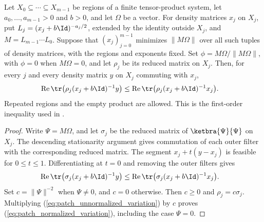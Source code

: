 \begin{theorem}
\label{thm:patch_normalized_first_variation}
\leanok
Let $X_0\subseteq\cdots\subseteq X_{m-1}$ be regions of a finite tensor-product
system, let $a_0,\dots,a_{m-1}>0$ and $b>0$, and let $\Omega$ be a vector.
For density matrices $x_j$ on $X_j$, put $L_j=(x_j+b\Id)^{-a_j/2}$,
extended by the identity outside $X_j$, and $M=L_{m-1}\cdots L_0$.
Suppose that $(x_j)_{j=0}^{m-1}$ minimizes $\lVert M\Omega\rVert$ over all
such tuples of density matrices, with the regions and exponents fixed.
Set $\phi=M\Omega/\lVert M\Omega\rVert$, with $\phi=0$ when $M\Omega=0$,
and let $\rho_j$ be its reduced matrix on $X_j$.
Then, for every $j$ and every density matrix $y$ on $X_j$ commuting with $x_j$,
\begin{align}
 \operatorname{Re}\tr\bigl(\rho_j(x_j+b\Id)^{-1}y\bigr)
 &\le \operatorname{Re}\tr\bigl(\rho_j(x_j+b\Id)^{-1}x_j\bigr).
 \label{eq:patch_normalized_variation}
\end{align}
Repeated regions and the empty product are allowed.
This is the first-order inequality used in
\cite[Section~4, first-order patch inequalities]{OpenAI2026PolynomialPEPS}.
\end{theorem}
\begin{proof}
\leanok
{}
Write $\Psi=M\Omega$, and let $\sigma_j$ be the reduced matrix of
$\ketbra{\Psi}{\Psi}$ on $X_j$. The descending stationarity argument gives
commutation of each outer filter with the corresponding reduced matrix.
The segment $x_j+t(y-x_j)$ is feasible for $0\le t\le1$.
Differentiating at $t=0$ and removing the outer filters gives
\begin{align}
 \operatorname{Re}\tr\bigl(\sigma_j(x_j+b\Id)^{-1}y\bigr)
 &\le \operatorname{Re}\tr\bigl(\sigma_j(x_j+b\Id)^{-1}x_j\bigr).
 \label{eq:patch_unnormalized_variation}
\end{align}
Set $c=\lVert\Psi\rVert^{-2}$ when $\Psi\ne0$, and $c=0$ otherwise.
Then $c\ge0$ and $\rho_j=c\sigma_j$. Multiplying
(\ref{eq:patch_unnormalized_variation}) by $c$ proves
(\ref{eq:patch_normalized_variation}), including the case $\Psi=0$.
\end{proof}

